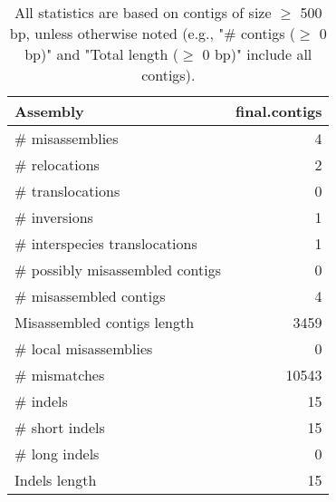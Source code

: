 \documentclass[12pt,a4paper]{article}
\begin{document}
\begin{table}[ht]
\begin{center}
\caption{All statistics are based on contigs of size $\geq$ 500 bp, unless otherwise noted (e.g., "\# contigs ($\geq$ 0 bp)" and "Total length ($\geq$ 0 bp)" include all contigs).}
\begin{tabular}{|l*{1}{|r}|}
\hline
Assembly & final.contigs \\ \hline
\# misassemblies & 4 \\ \hline
\hspace{5mm}\# relocations & 2 \\ \hline
\hspace{5mm}\# translocations & 0 \\ \hline
\hspace{5mm}\# inversions & 1 \\ \hline
\hspace{5mm}\# interspecies translocations & 1 \\ \hline
\# possibly misassembled contigs & 0 \\ \hline
\# misassembled contigs & 4 \\ \hline
Misassembled contigs length & 3459 \\ \hline
\# local misassemblies & 0 \\ \hline
\# mismatches & 10543 \\ \hline
\# indels & 15 \\ \hline
\hspace{5mm}\# short indels & 15 \\ \hline
\hspace{5mm}\# long indels & 0 \\ \hline
Indels length & 15 \\ \hline
\end{tabular}
\end{center}
\end{table}
\end{document}
